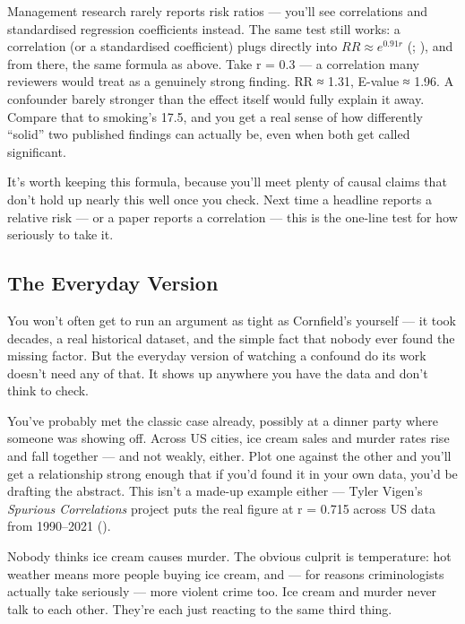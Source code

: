\documentclass[
]{book}
\begin{document}
Management research rarely reports risk ratios --- you'll see correlations and standardised regression coefficients instead. The same test still works: a correlation (or a standardised coefficient) plugs directly into \(RR \approx e^{0.91r}\) (; ), and from there, the same formula as above. Take r = 0.3 --- a correlation many reviewers would treat as a genuinely strong finding. RR ≈ 1.31, E-value ≈ 1.96. A confounder barely stronger than the effect itself would fully explain it away. Compare that to smoking's 17.5, and you get a real sense of how differently ``solid'' two published findings can actually be, even when both get called significant.

It's worth keeping this formula, because you'll meet plenty of causal claims that don't hold up nearly this well once you check. Next time a headline reports a relative risk --- or a paper reports a correlation --- this is the one-line test for how seriously to take it.

\subsection{The Everyday Version}\label{confounding-demo}

You won't often get to run an argument as tight as Cornfield's yourself --- it took decades, a real historical dataset, and the simple fact that nobody ever found the missing factor. But the everyday version of watching a confound do its work doesn't need any of that. It shows up anywhere you have the data and don't think to check.

You've probably met the classic case already, possibly at a dinner party where someone was showing off. Across US cities, ice cream sales and murder rates rise and fall together --- and not weakly, either. Plot one against the other and you'll get a relationship strong enough that if you'd found it in your own data, you'd be drafting the abstract. This isn't a made-up example either --- Tyler Vigen's \emph{Spurious Correlations} project puts the real figure at r = 0.715 across US data from 1990--2021 ().

Nobody thinks ice cream causes murder. The obvious culprit is temperature: hot weather means more people buying ice cream, and --- for reasons criminologists actually take seriously --- more violent crime too. Ice cream and murder never talk to each other. They're each just reacting to the same third thing.
\end{document}
